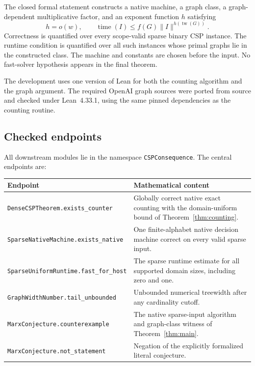 \documentclass[11pt,reqno]{amsart}
\numberwithin{equation}{section}
\theoremstyle{definition}
\theoremstyle{remark}
\newcommand{\tw}{\operatorname{tw}}
\begin{document}
The closed formal statement constructs a native machine, a graph class, a graph-dependent multiplicative factor, and an exponent function $h$ satisfying
\[
 h=o(w),\qquad
 \operatorname{time}(I)\le f(G)\lVert I\rVert^{h(\tw(G))}.
\]
Correctness is quantified over every scope-valid sparse binary CSP instance. The runtime condition is quantified over all such instances whose primal graphs lie in the constructed class. The machine and constants are chosen before the input. No fast-solver hypothesis appears in the final theorem.

The development uses one version of Lean for both the counting algorithm and the graph argument. The required OpenAI graph sources were ported from source and checked under Lean~4.33.1, using the same pinned dependencies as the counting routine.

\subsection{Checked endpoints}

All downstream modules lie in the namespace \texttt{CSPConsequence}. The central endpoints are:
\begin{center}
\small
\begin{tabular}{@{}p{}p{}@{}}
\toprule
Endpoint & Mathematical content\\
\midrule
\texttt{DenseCSPTheorem.}\allowbreak\texttt{exists\_counter}
 & Globally correct native exact counting with the domain-uniform bound of Theorem~\ref{thm:counting}.\\[3pt]
\texttt{SparseNativeMachine.}\allowbreak\texttt{exists\_native}
 & One finite-alphabet native decision machine correct on every valid sparse input.\\[3pt]
\texttt{SparseUniformRuntime.}\allowbreak\texttt{fast\_for\_host}
 & The sparse runtime estimate for all supported domain sizes, including zero and one.\\[3pt]
\texttt{GraphWidthNumber.}\allowbreak\texttt{tail\_unbounded}
 & Unbounded numerical treewidth after any cardinality cutoff.\\[3pt]
\texttt{MarxConjecture.}\allowbreak\texttt{counterexample}
 & The native sparse-input algorithm and graph-class witness of Theorem~\ref{thm:main}.\\[3pt]
\texttt{MarxConjecture.}\allowbreak\texttt{not\_statement}
 & Negation of the explicitly formalized literal conjecture.\\
\bottomrule
\end{tabular}
\end{center}
\end{document}
